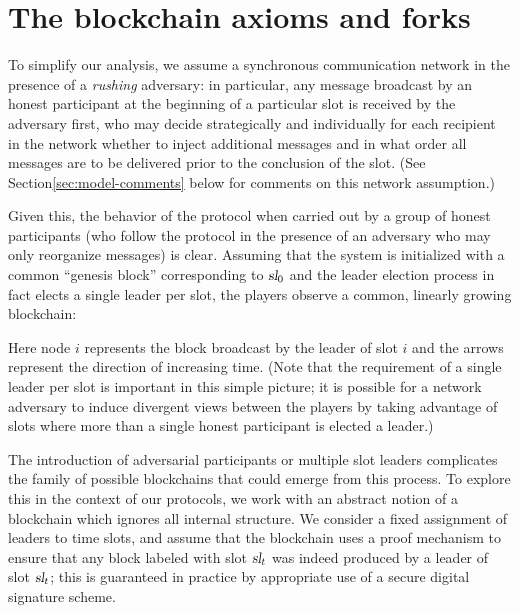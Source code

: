 \section{The blockchain axioms and forks}

To simplify our analysis, we assume a synchronous communication
network in the presence of a \emph{rushing} adversary: in particular,
any message broadcast by an honest participant at the beginning of a
particular slot is received by the adversary first, who may decide
strategically and individually for each recipient in the network
whether to inject additional messages and in what order all messages
are to be delivered prior to the conclusion of the slot. (See
Section\ref{sec:model-comments} below for comments on this network
assumption.)

Given this, the behavior of the protocol when carried out by a group
of honest participants (who follow the protocol in the presence of an
adversary who may only reorganize messages) is clear. Assuming that
the system is initialized with a common ``genesis block''
corresponding to $\textsl{sl}_0$ and the leader election process in fact
elects a single leader per slot, the players observe a common,
linearly growing blockchain:
\begin{center}
\end{center}
\noindent
Here node $i$ represents the block broadcast by the leader of slot $i$
and the arrows represent the direction of increasing time. (Note that
the requirement of a single leader per slot is important in this
simple picture; it is possible for a network adversary to induce
divergent views between the players by taking advantage of slots where
more than a single honest participant is elected a leader.)

The introduction of adversarial participants or multiple slot leaders
complicates the family of possible blockchains that could emerge from
this process. To explore this in the context of our protocols, we work
with an abstract notion of a blockchain which
ignores all internal structure. We consider a fixed assignment of
leaders to time slots, and assume that the blockchain uses a proof
mechanism to ensure that any block labeled with slot $\textsl{sl}_t$ was
indeed produced by a leader of slot $\textsl{sl}_t$; this is guaranteed in
practice by appropriate use of a secure digital signature scheme.

